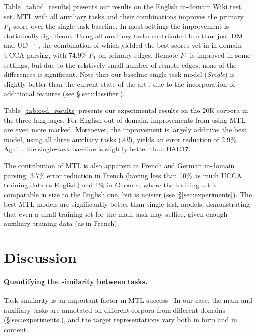 \documentclass[11pt,a4paper]{article}
\begin{document}
Table~\ref{tab:id_results} presents our results on the English in-domain Wiki test set.
MTL with all auxiliary tasks and their combinations improves the primary $F_1$ score over
the single task baseline. In most settings the improvement is statistically significant.
Using all auxiliary tasks contributed less than just DM and UD$^{++}$,
the combination of which yielded the best scores yet in in-domain UCCA parsing,
with 74.9\% $F_1$ on primary edges.
Remote $F_1$ is improved in some settings, but due to the relatively small number of remote
edges, none of the differences is significant.
Note that our baseline single-task model (\textit{Single})
is slightly better than the current state-of-the-art \cite[HAR17;][]{hershcovich2017a},
due to the incorporation of additional features (see \S\ref{sec:classifier}).

Table~\ref{tab:ood_results} presents our experimental results on the 20K corpora in the three languages.
For English out-of-domain, improvements from using MTL are even more marked. 
Moreoever, the improvement is largely additive: the best model, using all three auxiliary tasks (\textit{All}),
yields an error reduction of 2.9\%. Again, the single-task baseline is slightly better than HAR17.




The contribution of MTL is also apparent in French and German in-domain parsing:
3.7\% error reduction in French
(having less than 10\% as much UCCA training data as English)
and 1\% in German, where the training set is comparable in size to the English one,
but is noisier (see~\S\ref{sec:experiments}).
The best MTL models are significantly better than single-task models,
demonstrating that even a small training set for the main task may suffice,
given enough auxiliary training data (as in French).





\section{Discussion}\label{sec:discussion}

\paragraph{Quantifying the similarity between tasks.}
Task similarity is an important factor in MTL success
\cite{E17-2026,E17-1005}.
In our case, the main and auxiliary tasks are annotated on different corpora
from different domains (\S\ref{sec:experiments}), and
the target representations vary both in form and in content.
\end{document}
